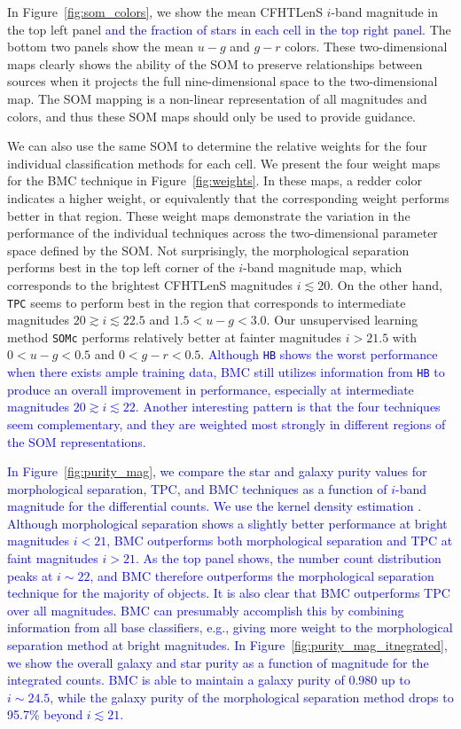 \documentclass[useAMS,usenatbib]{mn2e}
\newcommand{\eg}{{e.g., }}
\begin{document}
In Figure~\ref{fig:som_colors}, we show
the mean CFHTLenS $i$-band magnitude in the top left panel
\textcolor{blue}{
and the fraction of stars in each cell in the top right panel.
}
The bottom two panels show the mean $u-g$ and  $g-r$ colors.
These two-dimensional maps clearly shows
the ability of the SOM to preserve relationships between sources
when it projects the full nine-dimensional space to the two-dimensional map.
The SOM mapping is a non-linear representation of all magnitudes and colors,
and thus these SOM maps should only be used to provide guidance.

We can also use the same SOM to determine the relative weights for 
the four individual classification methods for each cell.
We present the four weight maps for the BMC technique
in Figure~\ref{fig:weights}.
In these maps, a redder color indicates a higher weight,
or equivalently that the corresponding weight performs better in that region.
These weight maps demonstrate the variation in
the performance of the individual techniques across
the two-dimensional parameter space defined by the SOM.
Not surprisingly, the morphological separation
performs best in the top left corner of the $i$-band magnitude map,
which corresponds to the brightest CFHTLenS magnitudes $i \lesssim 20$.
On the other hand, \texttt{TPC} seems to perform best
in the region that corresponds to intermediate magnitudes
$20\gtrsim i \lesssim22.5$ and $1.5<u-g<3.0$.
Our unsupervised learning method \texttt{SOMc}
performs relatively better at fainter magnitudes $i>21.5$
with $0<u-g<0.5$ and $0<g-r<0.5$.
\textcolor{blue}{
Although \texttt{HB} shows the worst performance
when there exists ample training data,
BMC still utilizes information from \texttt{HB}
to produce an overall improvement in performance,
especially at intermediate magnitudes $20\gtrsim i \lesssim22$.
Another interesting pattern is that
the four techniques seem complementary,
and they are weighted most strongly in different regions
of the SOM representations.}

\textcolor{blue}{In Figure~\ref{fig:purity_mag}, 
we compare the star and galaxy purity values
for morphological separation, TPC, and BMC techniques
as a function of $i$-band magnitude for the differential counts.
We use the kernel density estimation \cite[KDE;][]{silverman1986density}.
Although morphological separation shows a slightly better performance
at bright magnitudes $i < 21$,
BMC outperforms both morphological separation and TPC
at faint magnitudes $i > 21$.
As the top panel shows,
the number count distribution peaks at $i \sim 22$,
and BMC therefore outperforms the morphological separation technique
for the majority of objects.
It is also clear that BMC outperforms TPC over all magnitudes.
BMC can presumably accomplish this by combining information from
all base classifiers,
\eg giving more weight to the morphological separation method
at bright magnitudes.
In Figure~\ref{fig:purity_mag_itnegrated}, we show
the overall galaxy and star purity as a function of magnitude
for the integrated counts.
BMC is able to maintain a galaxy purity of 0.980
up to $i \sim 24.5$, while the galaxy purity of
the morphological separation method drops to 95.7\%
beyond $i \lesssim 21$.}
\end{document}

